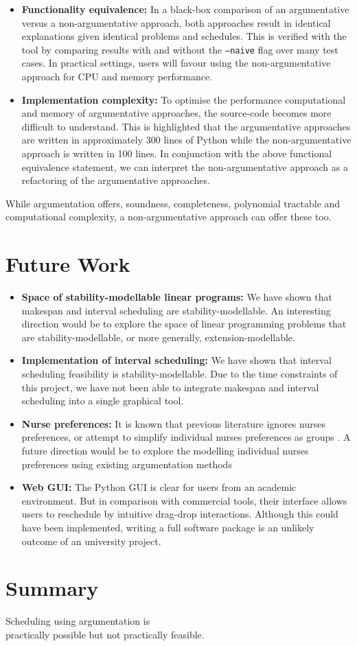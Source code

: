 \begin{itemize}
	\item\textbf{Functionality equivalence:} In a black-box comparison of an argumentative versus a non-argumentative approach, both approaches result in identical explanations given identical problems and schedules. This is verified with the tool by comparing results with and without the \texttt{--naive} flag over many test cases. In practical settings, users will favour using the non-argumentative approach for CPU and memory performance.
	\item\textbf{Implementation complexity: }To optimise the performance computational and memory of argumentative approaches, the source-code becomes more difficult to understand. This is highlighted that the argumentative approaches are written in approximately 300 lines of Python while the non-argumentative approach is written in 100 lines. In conjunction with the above functional equivalence statement, we can interpret the non-argumentative approach as a refactoring of the argumentative approaches.
\end{itemize}

While argumentation offers, soundness, completeness, polynomial tractable and computational complexity, a non-argumentative approach can offer these too.

\section{Future Work}

\begin{itemize}
	\item\textbf{Space of stability-modellable linear programs:} We have shown that makespan and interval scheduling are stability-modellable. An interesting direction would be to explore the space of linear programming problems that are stability-modellable, or more generally, extension-modellable.
	\item\textbf{Implementation of interval scheduling:} We have shown that interval scheduling feasibility is stability-modellable. Due to the time constraints of this project, we have not been able to integrate makespan and interval scheduling into a single graphical tool.
	\item\textbf{Nurse preferences:} It is known that previous literature ignores nurses preferences, or attempt to simplify individual nurses preferences as groups \cite{preferences}. A future direction would be to explore the modelling individual nurses preferences using existing argumentation methods \cite{acceptability, aba}
	\item\textbf{Web GUI:} The Python GUI is clear for users from an academic environment. But in comparison with commercial tools, their interface allows users to reschedule by intuitive drag-drop interactions. Although this could have been implemented, writing a full software package is an unlikely outcome of an university project. 
\end{itemize}

\section{Summary}

\begin{framed}
	\centering
	Scheduling using argumentation is\\practically
	possible but not practically feasible.
\end{framed}